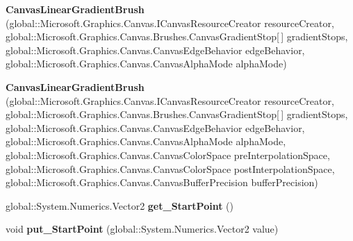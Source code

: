 \begin{DoxyCompactItemize}
\item 
\mbox{\label{class_microsoft_1_1_graphics_1_1_canvas_1_1_brushes_1_1_canvas_linear_gradient_brush_a84d29f89ab093f50d09215ddab09cbf1}} 
{\bfseries Canvas\+Linear\+Gradient\+Brush} (global\+::\+Microsoft.\+Graphics.\+Canvas.\+I\+Canvas\+Resource\+Creator resource\+Creator, global\+::\+Microsoft.\+Graphics.\+Canvas.\+Brushes.\+Canvas\+Gradient\+Stop\mbox{[}$\,$\mbox{]} gradient\+Stops, global\+::\+Microsoft.\+Graphics.\+Canvas.\+Canvas\+Edge\+Behavior edge\+Behavior, global\+::\+Microsoft.\+Graphics.\+Canvas.\+Canvas\+Alpha\+Mode alpha\+Mode)
\item 
\mbox{\label{class_microsoft_1_1_graphics_1_1_canvas_1_1_brushes_1_1_canvas_linear_gradient_brush_a5fbbd2cc60fa7f11f4ce627c5a243729}} 
{\bfseries Canvas\+Linear\+Gradient\+Brush} (global\+::\+Microsoft.\+Graphics.\+Canvas.\+I\+Canvas\+Resource\+Creator resource\+Creator, global\+::\+Microsoft.\+Graphics.\+Canvas.\+Brushes.\+Canvas\+Gradient\+Stop\mbox{[}$\,$\mbox{]} gradient\+Stops, global\+::\+Microsoft.\+Graphics.\+Canvas.\+Canvas\+Edge\+Behavior edge\+Behavior, global\+::\+Microsoft.\+Graphics.\+Canvas.\+Canvas\+Alpha\+Mode alpha\+Mode, global\+::\+Microsoft.\+Graphics.\+Canvas.\+Canvas\+Color\+Space pre\+Interpolation\+Space, global\+::\+Microsoft.\+Graphics.\+Canvas.\+Canvas\+Color\+Space post\+Interpolation\+Space, global\+::\+Microsoft.\+Graphics.\+Canvas.\+Canvas\+Buffer\+Precision buffer\+Precision)
\item 
\mbox{\label{class_microsoft_1_1_graphics_1_1_canvas_1_1_brushes_1_1_canvas_linear_gradient_brush_a2f1dcd8bc06e236375c0c79b270e53aa}} 
global\+::\+System.\+Numerics.\+Vector2 {\bfseries get\+\_\+\+Start\+Point} ()
\item 
\mbox{\label{class_microsoft_1_1_graphics_1_1_canvas_1_1_brushes_1_1_canvas_linear_gradient_brush_a52511f8d765c33e4e283bfbff7fe36b8}} 
void {\bfseries put\+\_\+\+Start\+Point} (global\+::\+System.\+Numerics.\+Vector2 value)
\item 
\mbox{\label{class_microsoft_1_1_graphics_1_1_canvas_1_1_brushes_1_1_canvas_linear_gradient_brush_ac3c3a6cf19b847fe48af885a0e9afc69}} 

\end{DoxyCompactItemize}
